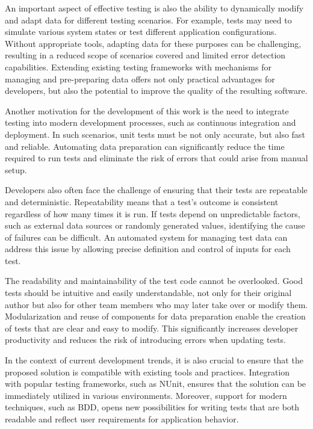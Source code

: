An important aspect of effective testing is also the ability to dynamically modify and adapt data for different testing scenarios. For example, tests may need to simulate various system states or test different application configurations. Without appropriate tools, adapting data for these purposes can be challenging, resulting in a reduced scope of scenarios covered and limited error detection capabilities. Extending existing testing frameworks with mechanisms for managing and pre-preparing data offers not only practical advantages for developers, but also the potential to improve the quality of the resulting software.

Another motivation for the development of this work is the need to integrate testing into modern development processes, such as continuous integration and deployment. In such scenarios, unit tests must be not only accurate, but also fast and reliable. Automating data preparation can significantly reduce the time required to run tests and eliminate the risk of errors that could arise from manual setup.

Developers also often face the challenge of ensuring that their tests are repeatable and deterministic. Repeatability means that a test's outcome is consistent regardless of how many times it is run. If tests depend on unpredictable factors, such as external data sources or randomly generated values, identifying the cause of failures can be difficult. An automated system for managing test data can address this issue by allowing precise definition and control of inputs for each test.

The readability and maintainability of the test code cannot be overlooked. Good tests should be intuitive and easily understandable, not only for their original author but also for other team members who may later take over or modify them. Modularization and reuse of components for data preparation enable the creation of tests that are clear and easy to modify. This significantly increases developer productivity and reduces the risk of introducing errors when updating tests.

In the context of current development trends, it is also crucial to ensure that the proposed solution is compatible with existing tools and practices. Integration with popular testing frameworks, such as NUnit, ensures that the solution can be immediately utilized in various environments. Moreover, support for modern techniques, such as \acf{BDD}, opens new possibilities for writing tests that are both readable and reflect user requirements for application behavior.

